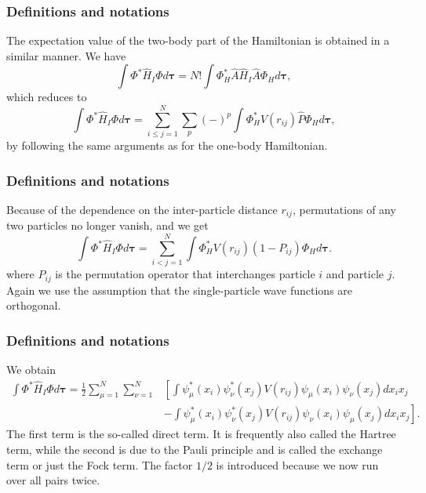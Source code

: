 \documentclass{beamer}
\begin{document}
\begin{frame}
\frametitle{Definitions and notations}

\begin{block}{}
The expectation value of the two-body part of the Hamiltonian is obtained in a
similar manner. We have
\[
  \int \Phi^*\hat{H}_I\Phi d\mathbf{\tau} 
  = N! \int \Phi_H^*\hat{A}\hat{H}_I\hat{A}\Phi_H d\mathbf{\tau},
\]
which reduces to
\[
 \int \Phi^*\hat{H}_I\Phi d\mathbf{\tau} 
  = \sum_{i\le j=1}^N \sum_{p} (-)^p\int 
  \Phi_H^*V(r_{ij})\hat{P}\Phi_H d\mathbf{\tau},
\]
by following the same arguments as for the one-body
Hamiltonian. 
\end{block}
\end{frame}

\begin{frame}
\frametitle{Definitions and notations}

\begin{block}{}
Because of the dependence on the inter-particle distance $r_{ij}$,  permutations of
any two particles no longer vanish, and we get
\[
  \int \Phi^*\hat{H}_I\Phi d\mathbf{\tau} 
  = \sum_{i < j=1}^N \int  
  \Phi_H^*V(r_{ij})(1-P_{ij})\Phi_H d\mathbf{\tau}.
\]
where $P_{ij}$ is the permutation operator that interchanges
particle $i$ and particle $j$. Again we use the assumption that the single-particle wave functions
are orthogonal. 
\end{block}
\end{frame}

\begin{frame}
\frametitle{Definitions and notations}

\begin{block}{}
We obtain
\begin{equation}
\begin{split}
  \int \Phi^*\hat{H}_I\Phi d\mathbf{\tau} 
  = \frac{1}{2}\sum_{\mu=1}^N\sum_{\nu=1}^N
    &\left[ \int \psi_{\mu}^*(x_i)\psi_{\nu}^*(x_j)V(r_{ij})\psi_{\mu}(x_i)\psi_{\nu}(x_j)
    dx_ix_j \right.\\
  &\left.
  - \int \psi_{\mu}^*(x_i)\psi_{\nu}^*(x_j)
  V(r_{ij})\psi_{\nu}(x_i)\psi_{\mu}(x_j)
  dx_ix_j
  \right]. \label{H2Expectation}
\end{split}
\end{equation}
The first term is the so-called direct term. It is frequently also called the  Hartree term, 
while the second is due to the Pauli principle and is called
the exchange term or just the Fock term.
The factor  $1/2$ is introduced because we now run over
all pairs twice. 
\end{block}
\end{frame}
\end{document}
